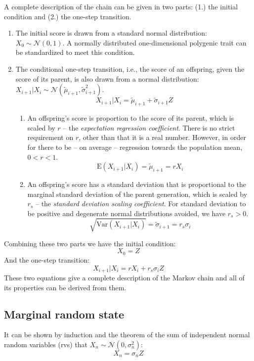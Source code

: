 \documentclass[a4paper,11pt]{article}
\begin{document}
A complete description of the chain can be given in two parts: (1.) the initial condition and (2.) the one-step transition. 

\begin{enumerate}
\item The initial score is drawn from a standard normal distribution: $X_0 \sim \mathcal{N}(0, 1)$. A normally distributed one-dimensional polygenic trait can be standardized to meet this condition.

\item The conditional one-step transition, i.e., the score of an offspring, given the score of its parent, is also drawn from a normal distribution: $X_{i+1}|X_i \sim \mathcal{N}(\tilde{\mu}_{i+1}, \tilde{\sigma}_{i+1}^2)$.
$$X_{i+1}|X_i = \tilde{\mu}_{i+1} + \tilde{\sigma}_{i+1} Z$$ 

\begin{enumerate}

\item An offspring's score is proportion to the score of its parent, which is scaled by $r$ -- the \emph{expectation regression coefficient}. There is no strict requirement on $r$, other than that it is a real number. However, in order for there to be -- on average -- regression towards the population mean, $0 < r < 1$.
$$\mathrm{E}(X_{i+1}|X_i) = \tilde{\mu}_{i+1} = rX_i$$

\item An offspring's score has a standard deviation that is proportional to the marginal standard deviation of the parent generation, which is scaled by  $r_s$ -- the \emph{standard deviation scaling coefficient}. For standard deviation to be positive and degenerate normal distributions avoided, we have $r_s > 0$.
$$\sqrt{\mathrm{Var}(X_{i+1}|X_i)} =\tilde{\sigma}_{i+1} = r_s \sigma_i$$
\end{enumerate}
\end{enumerate}

Combining these two parts we have the initial condition:
$$X_0 = Z$$
And the one-step transition:
$$X_{i+1}|X_i = rX_i+ r_s\sigma_iZ$$
These two equations give a complete description of the Markov chain and all of its properties can be derived from them.

\subsection{Marginal random state}
It can be shown by induction and the theorem of the sum of independent normal random variables (rvs) that $X_n \sim \mathcal{N}(0, \sigma_n^2)$:
$$X_n = \sigma_nZ$$
\end{document}
